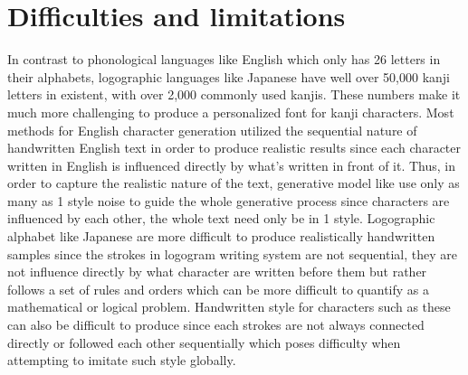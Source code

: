\documentclass[12pt]{report}
\begin{document}
\section{Difficulties and limitations}

In contrast to phonological languages like English which only has 26 letters in their alphabets, logographic languages like Japanese have well over 50,000 kanji letters in existent, with over 2,000 commonly used kanjis. These numbers make it much more challenging to produce a personalized font for kanji characters.
Most methods for English character generation utilized the sequential nature of handwritten English text in order to produce realistic results since each character written in English is influenced directly by what’s written in front of it. Thus, in order to capture the realistic nature of the text, generative model like \cite{scrabble-gan} use only as many as 1 style noise to guide the whole generative process since characters are influenced by each other, the whole text need only be in 1 style. Logographic alphabet like Japanese are more difficult to produce realistically handwritten samples since the strokes in logogram writing system are not sequential, they are not influence directly by what character are written before them but rather follows a set of rules and orders which can be more difficult to quantify as a mathematical or logical problem. Handwritten style for characters such as these can also be difficult to produce since each strokes are not always connected directly or followed each other sequentially which poses difficulty when attempting to imitate such style globally.
\end{document}
